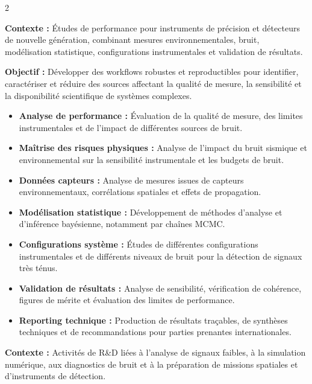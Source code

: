 \documentclass[8pt,a4paper,ragged2e,withhyper]{altacv}
\begin{document}
\begin{paracol}{2}
\divider


\textbf{Contexte :} Études de performance pour instruments de précision et détecteurs de nouvelle génération, combinant mesures environnementales, bruit, modélisation statistique, configurations instrumentales et validation de résultats.

\textbf{Objectif :} Développer des workflows robustes et reproductibles pour identifier, caractériser et réduire des sources affectant la qualité de mesure, la sensibilité et la disponibilité scientifique de systèmes complexes.

\begin{itemize}
  \item \textbf{Analyse de performance :} Évaluation de la qualité de mesure, des limites instrumentales et de l’impact de différentes sources de bruit.
  \item \textbf{Maîtrise des risques physiques :} Analyse de l’impact du bruit sismique et environnemental sur la sensibilité instrumentale et les budgets de bruit.
  \item \textbf{Données capteurs :} Analyse de mesures issues de capteurs environnementaux, corrélations spatiales et effets de propagation.
  \item \textbf{Modélisation statistique :} Développement de méthodes d’analyse et d’inférence bayésienne, notamment par chaînes MCMC.
  \item \textbf{Configurations système :} Études de différentes configurations instrumentales et de différents niveaux de bruit pour la détection de signaux très ténus.
  \item \textbf{Validation de résultats :} Analyse de sensibilité, vérification de cohérence, figures de mérite et évaluation des limites de performance.
  \item \textbf{Reporting technique :} Production de résultats traçables, de synthèses techniques et de recommandations pour parties prenantes internationales.
\end{itemize}

\divider


\textbf{Contexte :} Activités de R\&D liées à l’analyse de signaux faibles, à la simulation numérique, aux diagnostics de bruit et à la préparation de missions spatiales et d’instruments de détection.


\end{paracol}
\end{document}
